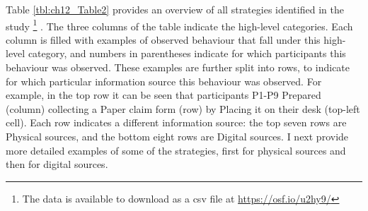 Table \ref{tbl:ch12_Table2} provides an overview of all strategies identified in the study \footnote{The data is available to download as a csv file at \url{https://osf.io/u2hy9/}} . The three columns of the table indicate the high-level categories. Each column is filled with examples of observed behaviour that fall under this high-level category, and numbers in parentheses indicate for which participants this behaviour was observed. These examples are further split into rows, to indicate for which particular information source this behaviour was observed. For example, in the top row it can be seen that participants P1-P9 Prepared (column) collecting a Paper claim form (row) by Placing it on their desk (top-left cell). Each row indicates a different information source: the top seven rows are Physical sources, and the bottom eight rows are Digital sources. I next provide more detailed examples of some of the strategies, first for physical sources and then for digital sources.

